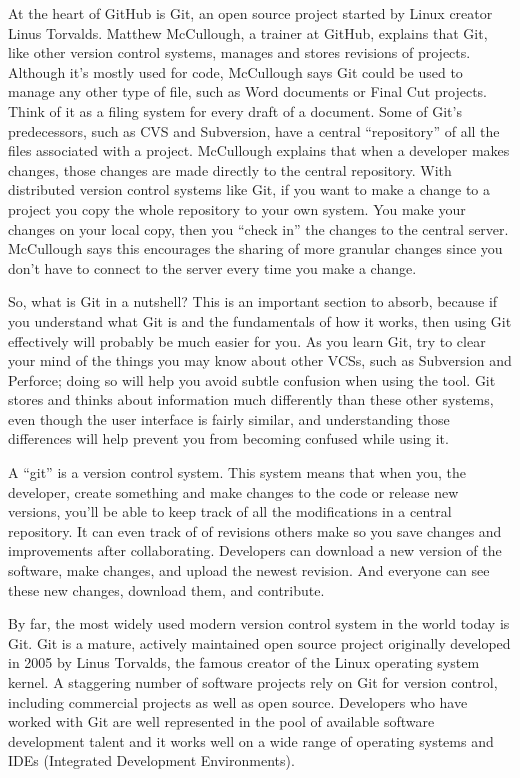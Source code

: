 At the heart of GitHub is Git, an open source project started by Linux creator Linus Torvalds. Matthew McCullough, a trainer at GitHub, explains that Git, like other version control systems, manages and stores revisions of projects. Although it’s mostly used for code, McCullough says Git could be used to manage any other type of file, such as Word documents or Final Cut projects. Think of it as a filing system for every draft of a document. Some of Git’s predecessors, such as CVS and Subversion, have a central “repository” of all the files associated with a project. McCullough explains that when a developer makes changes, those changes are made directly to the central repository. With distributed version control systems like Git, if you want to make a change to a project you copy the whole repository to your own system. You make your changes on your local copy, then you “check in” the changes to the central server. McCullough says this encourages the sharing of more granular changes since you don’t have to connect to the server every time you make a change.

So, what is Git in a nutshell? This is an important section to absorb, because if you understand what Git is and the fundamentals of how it works, then using Git effectively will probably be much easier for you. As you learn Git, try to clear your mind of the things you may know about other VCSs, such as Subversion and Perforce; doing so will help you avoid subtle confusion when using the tool. Git stores and thinks about information much differently than these other systems, even though the user interface is fairly similar, and understanding those differences will help prevent you from becoming confused while using it.

A “git” is a version control system. This system means that when you, the developer, create something and make changes to the code or release new versions, you’ll be able to keep track of all the modifications in a central repository. It can even track of of revisions others make so you save changes and improvements after collaborating. Developers can download a new version of the software, make changes, and upload the newest revision. And everyone can see these new changes, download them, and contribute.

By far, the most widely used modern version control system in the world today is Git. Git is a mature, actively maintained open source project originally developed in 2005 by Linus Torvalds, the famous creator of the Linux operating system kernel. A staggering number of software projects rely on Git for version control, including commercial projects as well as open source. Developers who have worked with Git are well represented in the pool of available software development talent and it works well on a wide range of operating systems and IDEs (Integrated Development Environments). 

